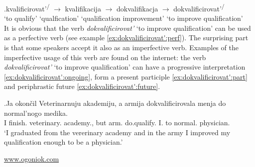 \exg.\label{chain:dokvalificirovat'}kvalificirovat'\textsuperscript{\PF\slash\IPF} {$\rightarrow$} kvalifikacija {$\rightarrow$} dokvalifikacja {$\rightarrow$} dokvalificirovat'\textsuperscript{\PF\slash\IPF}\\
{`to qualify'} {} {`qualfication'} {} {`qualification improvement'} {} {`to improve qualification'}\\

It is obvious that the verb \textit{dokvalificirovat'} `to improve qualification' can be used as a perfective verb (see example \ref{ex:dokvalificirovat':perf}). The surprising part is that some speakers accept it also as an imperfective verb. Examples of the imperfective usage of this verb are found on the internet: the verb \textit{dokvalificirovat'} `to improve qualification' can have a progressive interpretation \ref{ex:dokvalificirovat':ongoing}, form a present participle \ref{ex:dokvalificirovat':part} and periphrastic future \ref{ex:dokvalificirovat':future}. 

\exg.\label{ex:dokvalificirovat':perf}Ja okon\v{c}il Veterinarnuju akademiju, a armija dokvalificirovala menja do normal'nogo medika.\\
I finish. veterinary. academy., but arm. do.qualify. I. to normal. physician.\\
\trans `I graduated from the vererinary academy and in the army I improved my qualification enough to be a physician.'
\begin{flushright}
\vspace{-0.5em}
\url{www.ogoniok.com}
\end{flushright}

